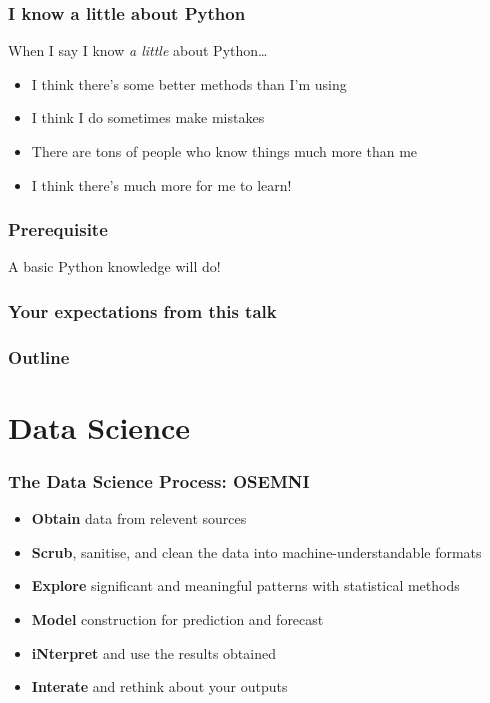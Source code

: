 \documentclass[aspectratio=169]{beamer}
\begin{document}
\begin{frame}
    \frametitle{I know a little about Python}
    { When I say I know \textit{a little} about Python\dots}
    \begin{itemize}[<+(2)->]
        \item I think there's some better methods than I'm using
        \item I think I do sometimes make mistakes
        \item There are tons of people who know things much more than me
        \item I think there's much more for me to learn!
    \end{itemize}
\end{frame}

\begin{frame}
    \frametitle{Prerequisite}
    A basic Python knowledge will do!
\end{frame}

\begin{frame}
    \frametitle{Your expectations from this talk}
\end{frame}

\begin{frame}
	\frametitle{Outline}
    \tableofcontents
\end{frame}

\section{Data Science}

\begin{frame}
    \frametitle{The Data Science Process: OSEMNI}
    \begin{itemize}[<+(1)->]
        \item \textbf{Obtain} data from relevent sources
        \item \textbf{Scrub}, sanitise, and clean the data into machine-understandable formats
        \item \textbf{Explore} significant and meaningful patterns with statistical methods
        \item \textbf{Model} construction for prediction and forecast
        \item \textbf{iNterpret} and use the results obtained
        \item \textbf{Interate} and rethink about your outputs
    \end{itemize}
\end{frame}
\end{document}
